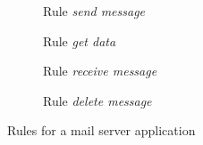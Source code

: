 \begin{figure}[!ht]
  \centering
  \begin{subfigure}[t]{.5\textwidth}
    \centerline{}
    \caption{Rule \emph{send message}}
  \end{subfigure}
  \begin{subfigure}[t]{.5\textwidth}
    \centerline{}
    \caption{Rule \emph{get data}}
  \end{subfigure}
  \begin{subfigure}[t]{.5\textwidth}
    \centerline{}
    \caption{Rule \emph{receive message}}
  \end{subfigure}
  \begin{subfigure}[t]{.5\textwidth}
    \centerline{}
    \caption{Rule \emph{delete message}}
  \end{subfigure}
  \caption{Rules for a mail server application}\label{fig:tests:grammar}
\end{figure}

